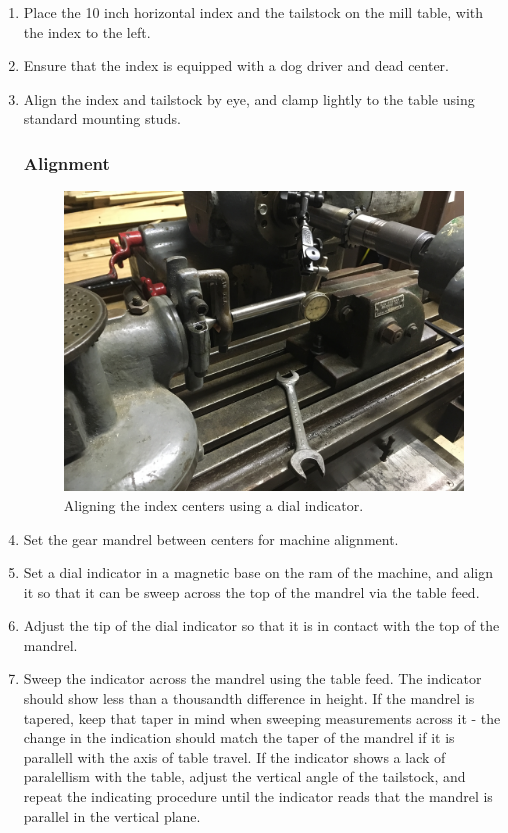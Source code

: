 \documentclass[12pt,twoside,letterpaper]{article}
\begin{document}
\begin{enumerate}
	\item Place the 10 inch horizontal index and the tailstock on the mill table, with the index to the left. 
	\item Ensure that the index is equipped with a dog driver and dead center.
	\item Align the index and tailstock by eye, and clamp lightly to the table using standard mounting studs.

\subsubsection{Alignment}
\begin{figure}[H]
\centering
\includegraphics[width=5in]{indexSetup}
	\caption{Aligning the index centers using a dial indicator.}
\end{figure}

	\item Set the gear mandrel between centers for machine alignment. 
	\item Set a dial indicator in a magnetic base on the ram of the machine, and align it so that it can be sweep across the top of the mandrel via the table feed. 
	\item Adjust the tip of the dial indicator so that it is in contact with the top of the mandrel.
		\clearpage
	\item Sweep the indicator across the mandrel using the table feed. The indicator should show less than a thousandth difference in height. If the mandrel is tapered, keep that taper in mind when sweeping measurements across it - the change in the indication should match the taper of the mandrel if it is parallell with the axis of table travel. If the indicator shows a lack of paralellism with the table, adjust the vertical angle of the tailstock, and repeat the indicating procedure until the indicator reads that the mandrel is parallel in the vertical plane.


\end{enumerate}
\end{document}
